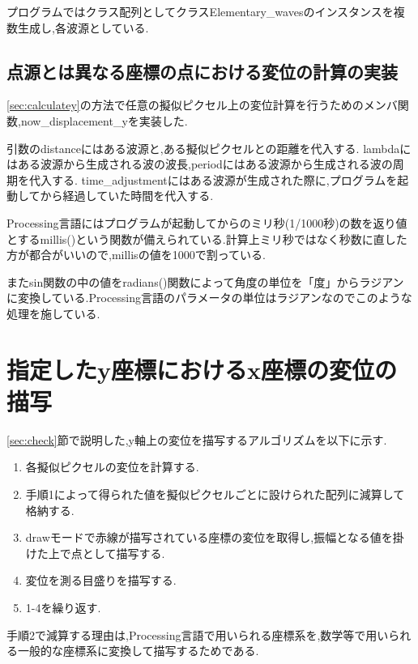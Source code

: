 プログラムではクラス配列としてクラスElementary\_wavesのインスタンスを複数生成し,各波源としている.


\subsection{点源とは異なる座標の点における変位の計算の実装}
\ref{sec:calculatey}の方法で任意の擬似ピクセル上の変位計算を行うためのメンバ関数,now\_displacement\_yを実装した.

引数のdistanceにはある波源と,ある擬似ピクセルとの距離を代入する.
lambdaにはある波源から生成される波の波長,periodにはある波源から生成される波の周期を代入する.
time\_adjustmentにはある波源が生成された際に,プログラムを起動してから経過していた時間を代入する.

Processing言語にはプログラムが起動してからのミリ秒(1/1000秒)の数を返り値とするmillis()という関数が備えられている.計算上ミリ秒ではなく秒数に直した方が都合がいいので,millisの値を1000で割っている.

またsin関数の中の値をradians()関数によって角度の単位を「度」からラジアンに変換している.Processing言語のパラメータの単位はラジアンなのでこのような処理を施している.

\section{指定したy座標におけるx座標の変位の描写}
\ref{sec:check}節で説明した,y軸上の変位を描写するアルゴリズムを以下に示す.
\begin{enumerate}
\item 各擬似ピクセルの変位を計算する.
\item 手順1によって得られた値を擬似ピクセルごとに設けられた配列に減算して格納する.
\item drawモードで赤線が描写されている座標の変位を取得し,振幅となる値を掛けた上で点として描写する.
\item 変位を測る目盛りを描写する.
\item 1-4を繰り返す.
\end{enumerate}
手順2で減算する理由は,Processing言語で用いられる座標系を,数学等で用いられる一般的な座標系に変換して描写するためである.

